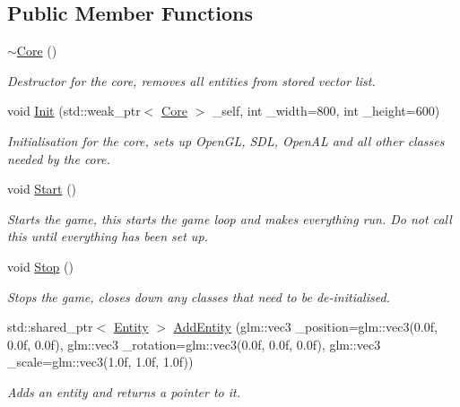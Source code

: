 \subsection*{Public Member Functions}
\begin{DoxyCompactItemize}
\item 
\hyperlink{classfrontier_1_1_core_a4d5ae078d34758c54c517bede518e2e4}{$\sim$\+Core} ()
\begin{DoxyCompactList}\small\item\em Destructor for the core, removes all entities from stored vector list. \end{DoxyCompactList}\item 
void \hyperlink{classfrontier_1_1_core_a4faf575f20b1d83732da965476275371}{Init} (std\+::weak\+\_\+ptr$<$ \hyperlink{classfrontier_1_1_core}{Core} $>$ \+\_\+self, int \+\_\+width=800, int \+\_\+height=600)
\begin{DoxyCompactList}\small\item\em Initialisation for the core, sets up Open\+GL, S\+DL, Open\+AL and all other classes needed by the core. \end{DoxyCompactList}\item 
void \hyperlink{classfrontier_1_1_core_a184b56e6f852d9670168111e5e1a1bc2}{Start} ()
\begin{DoxyCompactList}\small\item\em Starts the game, this starts the game loop and makes everything run. Do not call this until everything has been set up. \end{DoxyCompactList}\item 
void \hyperlink{classfrontier_1_1_core_af73d19f41d8316a7e0a6e11137201ed9}{Stop} ()
\begin{DoxyCompactList}\small\item\em Stops the game, closes down any classes that need to be de-\/initialised. \end{DoxyCompactList}\item 
std\+::shared\+\_\+ptr$<$ \hyperlink{classfrontier_1_1_entity}{Entity} $>$ \hyperlink{classfrontier_1_1_core_a6e7da5742a26a76b46a6f02aa079929c}{Add\+Entity} (glm\+::vec3 \+\_\+position=glm\+::vec3(0.\+0f, 0.\+0f, 0.\+0f), glm\+::vec3 \+\_\+rotation=glm\+::vec3(0.\+0f, 0.\+0f, 0.\+0f), glm\+::vec3 \+\_\+scale=glm\+::vec3(1.\+0f, 1.\+0f, 1.\+0f))
\begin{DoxyCompactList}\small\item\em Adds an entity and returns a pointer to it. \end{DoxyCompactList}\item 

\end{DoxyCompactItemize}
